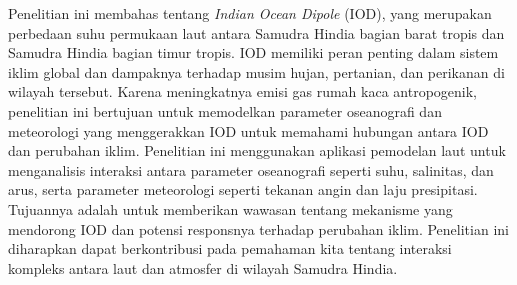 \begin{spacing}{1.5}
	\pagestyle{empty}
	\begin{center}
		\vskip 1cm
		\justifying
		Penelitian ini membahas tentang \textit{Indian Ocean Dipole} (IOD), yang merupakan perbedaan suhu permukaan laut antara Samudra Hindia bagian barat tropis dan Samudra Hindia bagian timur tropis. IOD memiliki peran penting dalam sistem iklim global dan dampaknya terhadap musim hujan, pertanian, dan perikanan di wilayah tersebut. Karena meningkatnya emisi gas rumah kaca antropogenik, penelitian ini bertujuan untuk memodelkan parameter oseanografi dan meteorologi yang menggerakkan IOD untuk memahami hubungan antara IOD dan perubahan iklim. Penelitian ini menggunakan aplikasi pemodelan laut untuk menganalisis interaksi antara parameter oseanografi seperti suhu, salinitas, dan arus, serta parameter meteorologi seperti tekanan angin dan laju presipitasi. Tujuannya adalah untuk memberikan wawasan tentang mekanisme yang mendorong IOD dan potensi responsnya terhadap perubahan iklim. Penelitian ini diharapkan dapat berkontribusi pada pemahaman kita tentang interaksi kompleks antara laut dan atmosfer di wilayah Samudra Hindia.
	\end{center}
\end{spacing}
\pagestyle{empty}